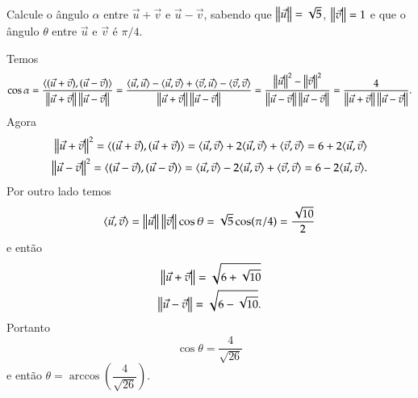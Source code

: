 \begin{exemplos}
  Calcule o \^angulo $\alpha$ entre $\vec{u} + \vec{v}$ e $\vec{u} - \vec{v}$, sabendo que $\left\Vert{\vec{u}}\right\Vert = \sqrt{5}$, $\left\Vert{\vec{v}}\right\Vert = 1$ e que o \^angulo $\theta$ entre $\vec{u}$ e $\vec{v}$ \'e $\pi/4$.
  \begin{solucao}
    Temos
    \begin{align*}
      \cos\alpha = \dfrac{\langle(\vec{u} + \vec{v}), (\vec{u} - \vec{v})\rangle}{\left\Vert{\vec{u} + \vec{v}}\right\Vert\left\Vert{\vec{u} - \vec{v}}\right\Vert} = \dfrac{\langle \vec{u}, \vec{u} \rangle - \langle \vec{u}, \vec{v} \rangle + \langle \vec{v}, \vec{u} \rangle - \langle \vec{v}, \vec{v} \rangle}{\left\Vert{\vec{u} + \vec{v}}\right\Vert\left\Vert{\vec{u} - \vec{v}}\right\Vert} = \dfrac{\left\Vert{\vec{u}}\right\Vert^2 - \left\Vert{\vec{v}}\right\Vert^2}{\left\Vert{\vec{u} - \vec{v}}\right\Vert\left\Vert{\vec{u} - \vec{v}}\right\Vert} = \dfrac{4}{\left\Vert{\vec{u} + \vec{v}}\right\Vert\left\Vert{\vec{u} - \vec{v}}\right\Vert}.
    \end{align*}
    Agora
    \begin{align*}
      \left\Vert{\vec{u} + \vec{v}}\right\Vert^2 = \langle(\vec{u} + \vec{v}), (\vec{u} + \vec{v})\rangle = \langle \vec{u}, \vec{v} \rangle + 2\langle \vec{u}, \vec{v} \rangle + \langle \vec{v}, \vec{v} \rangle = 6 + 2\langle \vec{u}, \vec{v} \rangle\\
      \left\Vert{\vec{u} - \vec{v}}\right\Vert^2 = \langle(\vec{u} - \vec{v}), (\vec{u} - \vec{v})\rangle = \langle \vec{u}, \vec{v} \rangle - 2\langle \vec{u}, \vec{v} \rangle + \langle \vec{v}, \vec{v} \rangle = 6 - 2\langle \vec{u}, \vec{v} \rangle.
    \end{align*}
    Por outro lado temos
    \begin{align*}
      \langle \vec{u}, \vec{v} \rangle = \left\Vert{\vec{u}}\right\Vert\left\Vert{\vec{v}}\right\Vert\cos\theta = \sqrt{5}\cos(\pi/4) = \dfrac{\sqrt{10}}{2}
    \end{align*}
    e ent\~ao
    \begin{align*}
      \left\Vert{\vec{u} + \vec{v}}\right\Vert = \sqrt{6 + \sqrt{10}}\\
      \left\Vert{\vec{u} - \vec{v}}\right\Vert = \sqrt{6 - \sqrt{10}}.
    \end{align*}
    Portanto
    \[
      \cos\theta = \dfrac{4}{\sqrt{26}}
    \]
    e ent\~ao $\theta = \arccos\left(\dfrac{4}{\sqrt{26}}\right)$.
  \end{solucao}
\end{exemplos}

